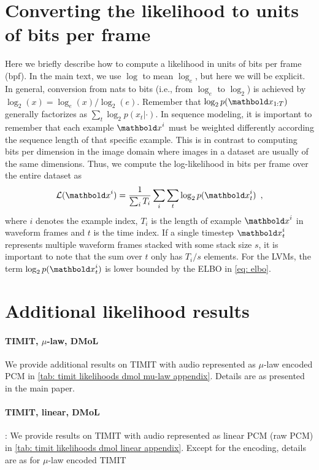{\section{Converting the likelihood to units of bits per frame}\label{app: likelihood in bits per frame}
Here we briefly describe how to compute a likelihood in units of bits per frame (bpf). In the main text, we use $\log$ to mean $\log_e$, but here we will be explicit. In general, conversion from nats to bits (i.e., from $\log_e$ to $\log_2$) is achieved by $\log_2(x) = \log_e(x)  / \log_2(e) $. Remember that $\log_2 p(\xb_{1:T})$ generally factorizes as $\sum_t \log_2 p(x_t|\cdot)$. In sequence modeling, it is important to remember that each example $\xb^{i}$ must be weighted differently according the sequence length of that specific example. This is in contrast to computing bits per dimension in the image domain where images in a dataset are usually of the same dimensions. Thus, we compute the log-likelihood in bits per frame over the entire dataset as
\begin{equation}
    \mathcal{L}(\xb^{i}) = \frac{1}{\sum_i T_i} \sum_i \sum_t \log_2 p(\xb_t^{i}) \enspace ,
\end{equation}
where $i$ denotes the example index, $T_i$ is the length of example $\xb^i$ in waveform frames and $t$ is the time index. If a single timestep $\xb_t^i$ represents multiple waveform frames stacked with some stack size $s$, it is important to note that the sum over $t$ only has $T_i/s$ elements. 
For the LVMs, the term $\log_2 p(\xb_t^{i})$ is lower bounded by the ELBO in \eqref{eq: elbo}. 


\section{Additional likelihood results} \label{app: additional likelihood results appendix}

\paragraph{TIMIT, $\mu$-law, DMoL} We provide additional results on TIMIT with audio represented as $\mu$-law encoded PCM in \cref{tab: timit likelihoods dmol mu-law appendix}. Details are as presented in the main paper.

\paragraph{TIMIT, linear, DMoL}: We provide results on TIMIT with audio represented as linear PCM (raw PCM) in \cref{tab: timit likelihoods dmol linear appendix}. Except for the encoding, details are as for $\mu$-law encoded TIMIT

}
